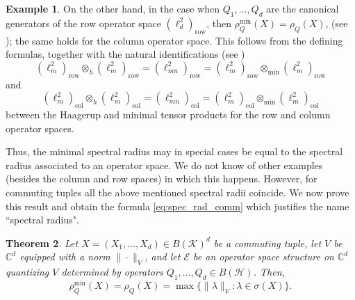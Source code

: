 \documentclass[12pt]{amsart}
\numberwithin{equation}{section}
\newtheorem{theorem}{Theorem}[section]
\theoremstyle{definition}
\newtheorem{example}[theorem]{Example}
\newcommand{\cE}{\mathcal{E}}
\newcommand{\cH}{\mathcal{H}}
\newcommand{\cK}{\mathcal{K}}
\newcommand{\bC}{\mathbb{C}}
\newcommand{\C}{\mathbb{C}}
\begin{document}
\begin{example}\label{ex:specrad_row_column}
On the other hand, in the case when $Q_1, \ldots, Q_d$ are the canonical generators of the row operator space $\left(\ell^2_d \right)_{\operatorname{row}}$, then $\rho^{\min}_Q(X) = \rho_Q(X)$,  (see \cite[Examples 2.10]{shalsham2025spectral}); the same holds for the column operator space. 
This follows from the defining formulas, together with the natural identifications (see \cite[p. 95]{Pisier-book})
\[
\left(\ell^2_m \right)_{\operatorname{row}} \otimes_h \left(\ell^2_m \right)_{\operatorname{row}} = \left(\ell^2_{mn} \right)_{\operatorname{row}} = \left(\ell^2_m \right)_{\operatorname{row}} \otimes_{\min}  \left(\ell^2_m \right)_{\operatorname{row}}
\]
and 
\[
\left(\ell^2_m \right)_{\operatorname{col}} \otimes_h \left(\ell^2_m \right)_{\operatorname{col}} = \left(\ell^2_{mn} \right)_{\operatorname{col}} = \left(\ell^2_m \right)_{\operatorname{col}} \otimes_{\min}  \left(\ell^2_m \right)_{\operatorname{col}}
\]
between the Haagerup and minimal tensor products for the row and column operator spaces. 
\end{example}

Thus, the minimal spectral radius may in special cases be equal to the spectral radius associated to an operator space. 
We do not know of other examples (besides the column and row spaces) in which this happens. 
However, for commuting tuples all the above mentioned spectral radii coincide. 
We now prove this result and obtain the formula \eqref{eq:spec_rad_comm}
which justifies the name ``spectral radius".

\begin{theorem} \label{thm:min_specrad}
    Let $X = (X_1,\ldots,X_d) \in B(\cK)^d$ be a commuting tuple, let $V$ be $\bC^d$ equipped with a norm $\|\cdot\|_V$, and let $\cE$ be an operator space structure on $\C^d$ quantizing $V$ determined by operators $Q_1, \ldots, Q_d \in B(\cH)$. Then, 
    \begin{equation}\label{eq:spec_rad_comm}
    \rho_Q^{\min}(X) = \rho_Q(X) = \max\{\|\lambda\|_V : \lambda \in \sigma(X) \}.
    \end{equation}
\end{theorem}
\end{document}
